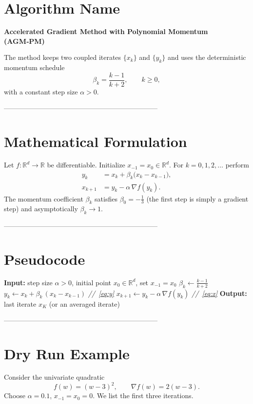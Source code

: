 \documentclass{article}
\begin{document}
\section*{Algorithm Name}
\textbf{Accelerated Gradient Method with Polynomial Momentum (AGM‑PM)}  

The method keeps two coupled iterates $\{x_k\}$ and $\{y_k\}$ and uses the deterministic momentum schedule  
\[
\beta_k=\frac{k-1}{k+2},\qquad k\ge 0,
\]
with a constant step size $\alpha>0$.

--------------------------------------------------------------------

\section*{Mathematical Formulation}
Let $f:\mathbb{R}^d\rightarrow\mathbb{R}$ be differentiable.  
Initialize $x_{-1}=x_0\in\mathbb{R}^d$. For $k=0,1,2,\dots$ perform
\begin{align}
y_k &= x_k+\beta_k\bigl(x_k-x_{k-1}\bigr), \label{eq:y}\\
x_{k+1} &= y_k-\alpha \,\nabla f(y_k). \label{eq:x}
\end{align}
The momentum coefficient $\beta_k$ satisfies $\beta_0= -\tfrac13$ (the first step is simply a gradient step) and asymptotically $\beta_k\to1$.

--------------------------------------------------------------------

\section*{Pseudocode}
\begin{algorithm}[H]
\caption{AGM‑PM}
\begin{algorithmic}[1]
\STATE \textbf{Input:} step size $\alpha>0$, initial point $x_0\in\mathbb{R}^d$, set $x_{-1}=x_0$
    \STATE $\displaystyle \beta_k \gets \frac{k-1}{k+2}$
    \STATE $\displaystyle y_k \gets x_k + \beta_k\,(x_k-x_{k-1})$ \hfill\textit{//~\eqref{eq:y}}
    \STATE $\displaystyle x_{k+1} \gets y_k - \alpha\,\nabla f(y_k)$ \hfill\textit{//~\eqref{eq:x}}
\ENDFOR
\STATE \textbf{Output:} last iterate $x_{K}$ (or an averaged iterate)
\end{algorithmic}
\end{algorithm}

--------------------------------------------------------------------

\section*{Dry Run Example}
Consider the univariate quadratic
\[
f(w)=(w-3)^2,
\qquad \nabla f(w)=2(w-3).
\]
Choose $\alpha=0.1$, $x_{-1}=x_0=0$.  
We list the first three iterations.
\end{document}
